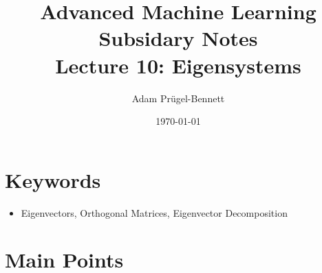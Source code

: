 \documentclass[11pt]{article}
\author{Adam Prügel-Bennett}
\date{\today}
\title{Advanced Machine Learning Subsidary Notes\\\medskip
\large Lecture 10: Eigensystems}
\begin{document}
\maketitle


\section{Keywords}
\label{sec:org5f0966a}
\begin{itemize}
\item Eigenvectors, Orthogonal Matrices, Eigenvector Decomposition
\end{itemize}

\section{Main Points}
\label{sec:org6f11307}
\end{document}
